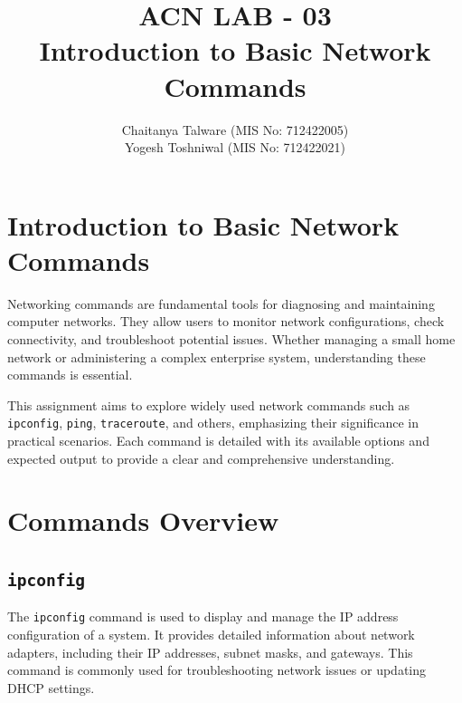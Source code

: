 \documentclass{article}
\title{ACN LAB - 03 \\Introduction to Basic Network Commands}
\author{Chaitanya Talware (MIS No: 712422005) \\ Yogesh Toshniwal (MIS No: 712422021)}
\date{}
\begin{document}
\maketitle
\clearpage  %
\section{Introduction to Basic Network Commands}
Networking commands are fundamental tools for diagnosing and maintaining computer networks. 
They allow users to monitor network configurations, check connectivity, and troubleshoot potential issues. 
Whether managing a small home network or administering a complex enterprise system, understanding these commands is essential.

This assignment aims to explore widely used network commands such as \texttt{ipconfig}, \texttt{ping}, \texttt{traceroute}, and others, emphasizing their significance in practical scenarios. Each command is detailed with its available options and expected output to provide a clear and comprehensive understanding.

\section{Commands Overview}

\subsection{\texttt{ipconfig}}
The \texttt{ipconfig} command is used to display and manage the IP address configuration of a system. It provides detailed information about network adapters, including their IP addresses, subnet masks, and gateways. This command is commonly used for troubleshooting network issues or updating DHCP settings.
\end{document}
